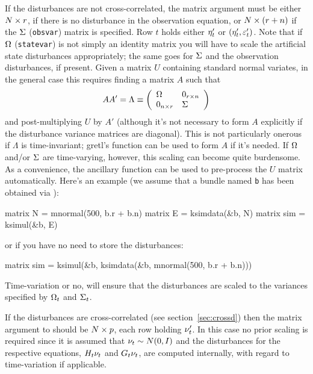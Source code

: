 If the disturbances are not cross-correlated, the matrix argument must
be either $N \times r$, if there is no disturbance in the
observation equation, or $N \times (r + n)$ if the
$\Sigma$ (\texttt{obsvar}) matrix is specified. Row $t$ holds either
$\eta_t'$ or $(\eta_t', \varepsilon_t')$. Note that if $\Omega$
(\texttt{statevar}) is not simply an identity matrix you will have to
scale the artificial state disturbances appropriately; the same goes
for $\Sigma$ and the observation disturbances, if present. Given a
matrix $U$ containing standard normal variates, in the general case
this requires finding a matrix $A$ such that
\[
AA' = \Lambda \equiv \left(
\begin{array}{ll}
\Omega & 0_{r \times n} \\
0_{n\times r} & \Sigma
\end{array}
\right)
\]
and post-multiplying $U$ by $A'$ (although it's not necessary to form
$A$ explicitly if the disturbance variance matrices are
diagonal). This is not particularly onerous if $\Lambda$ is
time-invariant; gretl's  function can be used to form $A$
if it's needed. If $\Omega$ and/or $\Sigma$ are time-varying,
however, this scaling can become quite burdensome. As a convenience,
the ancillary function  can be used to pre-process the
$U$ matrix automatically. Here's an example (we assume that a bundle
named \texttt{b} has been obtained via ):
%
\begin{code}
matrix N = mnormal(500, b.r + b.n)
matrix E = ksimdata(&b, N)
matrix sim = ksimul(&b, E)
\end{code}
%
or if you have no need to store the disturbances:
%
\begin{code}
matrix sim = ksimul(&b, ksimdata(&b, mnormal(500, b.r + b.n)))
\end{code}
%
Time-variation or no,  will ensure that the disturbances
are scaled to the variances specified by $\Omega_t$ and
$\Sigma_t$.

If the disturbances are cross-correlated (see
section~\ref{sec:crossd}) then the matrix argument to 
should be $N \times p$, each row holding $\nu_t'$. In this case
no prior scaling is required since it is assumed that
$\nu_t \sim N(0, I)$ and the disturbances for the respective
equations, $H_t \nu_t$ and $G_t \nu_t$,
are computed internally, with regard to time-variation if applicable.


